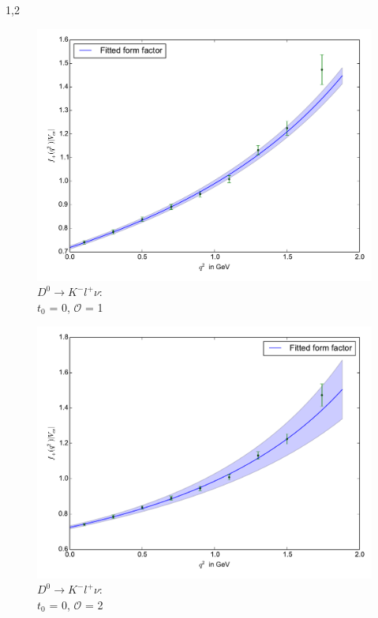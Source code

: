 \documentclass[11pt,a4paper,twoside]{report}
\begin{document}
\begin{spacing}{1,2}
 
 \begin{minipage}[H]{0.45\textwidth}
 \begin{figure}[H]
 \includegraphics[width=1\textwidth]{Fit/D0-1Ord-0.pdf}
 \caption{$D^0\rightarrow K^- l^+ \nu$: \\$t_0$ = 0, $\mathcal{O}$ = 1}
 \label{pic_D0-1Ord-0}
 \end{figure}
 \end{minipage}
 \hfill
 \begin{minipage}[H]{0.45\textwidth}
 \begin{figure}[H]
 \includegraphics[width=1\textwidth]{Fit/D0-2Ord-0.pdf}
 \caption{$D^0\rightarrow K^- l^+ \nu$: \\$t_0$ = 0, $\mathcal{O}$ = 2}
 \label{pic_D0-2Ord-0}
 \end{figure}
 \end{minipage}
 

\end{spacing}
\end{document}
